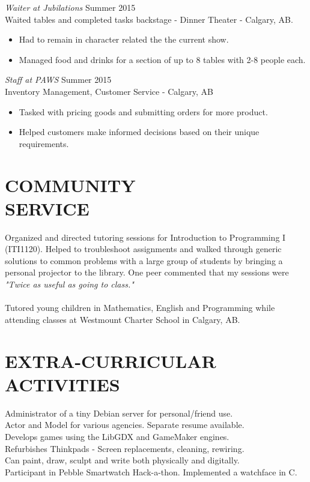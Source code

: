 \documentclass[margin]{res}
\begin{document}
\begin{resume}
                {\sl Waiter at Jubilations} \hfill        Summer 2015 \\
               	Waited tables and completed tasks backstage - Dinner Theater - Calgary, AB.
\begin{itemize}  \itemsep -2pt %
                 \item Had to remain in character related the the current show.
                 \item Managed food and drinks for a section of up to 8 tables with 2-8 people each.
                 \end{itemize} 
                   
                {\sl Staff at PAWS} \hfill        Summer 2015 \\
Inventory Management, Customer Service - Calgary, AB      
\begin{itemize}  \itemsep -2pt %
                 \item Tasked with pricing goods and submitting orders for more product.
                 \item Helped customers make informed decisions based on their unique requirements.
                 \end{itemize}          	

 \section{COMMUNITY \\ SERVICE}  Organized and directed tutoring sessions for Introduction to Programming I (ITI1120). Helped to troubleshoot assignments and walked through generic solutions to common problems with a large group of students by bringing a personal projector to the library. One peer commented that my sessions were {\sl "Twice as useful as going to class."}\\
\\Tutored young children in Mathematics, English and Programming while attending classes at Westmount Charter School in Calgary, AB.


\section{EXTRA-CURRICULAR \\ ACTIVITIES}        
Administrator of a tiny Debian server for personal/friend use.\\     
           	Actor and Model for various agencies. Separate resume available.\\
           	Develops games using the LibGDX and GameMaker engines. \\
           	Refurbishes Thinkpads - Screen replacements, cleaning, rewiring.\\
           	Can paint, draw, sculpt and write both physically and digitally.\\
           	Participant in Pebble Smartwatch Hack-a-thon. Implemented a watchface in C.
           	

\end{resume}
\end{document}
